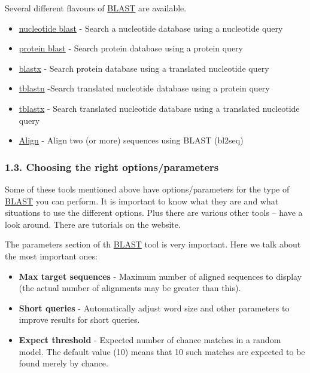 \documentclass[]{article}
\begin{document}
Several different flavours of
\href{http://blast.ncbi.nlm.nih.gov/}{BLAST} are available.

\begin{itemize}
\itemsep1pt\parskip0pt
\item
  \href{http://blast.ncbi.nlm.nih.gov/Blast.cgi?PROGRAM=blastn\&PAGE_TYPE=BlastSearch\&LINK_LOC=blasthome}{nucleotide
  blast} - Search a nucleotide database using a nucleotide query
\item
  \href{http://blast.ncbi.nlm.nih.gov/Blast.cgi?PROGRAM=blastp\&PAGE_TYPE=BlastSearch\&LINK_LOC=blasthome}{protein
  blast} - Search protein database using a protein query
\item
  \href{http://blast.ncbi.nlm.nih.gov/Blast.cgi?PROGRAM=blastx\&PAGE_TYPE=BlastSearch\&LINK_LOC=blasthome}{blastx}
  - Search protein database using a translated nucleotide query
\item
  \href{http://blast.ncbi.nlm.nih.gov/Blast.cgi?PROGRAM=tblastn\&PAGE_TYPE=BlastSearch\&LINK_LOC=blasthome}{tblastn}
  -Search translated nucleotide database using a protein query
\item
  \href{http://blast.ncbi.nlm.nih.gov/Blast.cgi?PROGRAM=tblastx\&PAGE_TYPE=BlastSearch\&LINK_LOC=blasthome}{tblastx}
  - Search translated nucleotide database using a translated nucleotide
  query
\item
  \href{http://blast.ncbi.nlm.nih.gov/Blast.cgi?PAGE_TYPE=BlastSearch\&BLAST_SPEC=blast2seq\&LINK_LOC=align2seq}{Align}
  - Align two (or more) sequences using BLAST (bl2seq)
\end{itemize}

\subsubsection{1.3. Choosing the right
options/parameters}\label{choosing-the-right-optionsparameters}

Some of these tools mentioned above have options/parameters for the type
of \href{http://blast.ncbi.nlm.nih.gov/}{BLAST} you can perform. It is
important to know what they are and what situations to use the different
options. Plus there are various other tools -- have a look around. There
are tutorials on the website.

The parameters section of th
\href{http://blast.ncbi.nlm.nih.gov/}{BLAST} tool is very important.
Here we talk about the most important ones:

\begin{itemize}
\itemsep1pt\parskip0pt
\item
  \textbf{Max target sequences} - Maximum number of aligned sequences to
  display (the actual number of alignments may be greater than this).
\item
  \textbf{Short queries} - Automatically adjust word size and other
  parameters to improve results for short queries.
\item
  \textbf{Expect threshold} - Expected number of chance matches in a
  random model. The default value (10) means that 10 such matches are
  expected to be found merely by chance.
\end{itemize}
\end{document}
